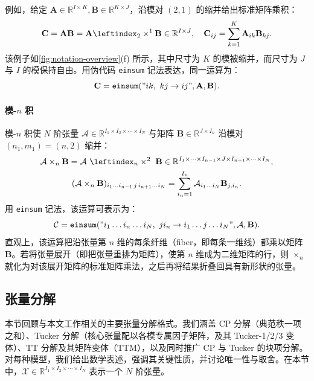 \documentclass[11pt]{article}
\newcommand{\R}{\mathbb{R}}
\newcommand{\ten}[1]{\mathcal{#1}}
\newcommand{\mat}[1]{\mathbf{#1}}
\begin{document}
例如，给定 $\mat{A} \in \R^{I \times K}, \mat{B} \in \R^{K \times J}$，沿模对 $(2,1)$ 的缩并给出标准矩阵乘积：
\begin{equation}
  \mat{C} = \mat{A} \mat{B} = \mat{A} \leftindex_{2} \times^{1} \mat{B} \in \R^{I \times J}, \quad \mat{C}_{ij} = \sum_{k=1}^{K} \mat{A}_{ik} \mat{B}_{kj}.
\end{equation}
该例子如\cref{fig:notation-overview}(f) 所示，其中尺寸为 $K$ 的模被缩并，而尺寸为 $J$ 与 $I$ 的模保持自由。用伪代码 \texttt{einsum} 记法表达，同一运算为：
\begin{equation}
  \mat{C} = \texttt{einsum}({"} ik, \ kj \to ij {"}, \mat{A}, \mat{B}).
\end{equation}

\paragraph{模-$n$ 积} 模-$n$ 积使 $N$ 阶张量 $\ten{A}\in\R^{I_1\times I_2 \times \cdots\times I_N}$ 与矩阵 $\mat{B}\in\R^{J\times I_n}$ 沿模对 $(n_1,m_1)=(n,2)$ 缩并：
\begin{equation}
\begin{gathered}
    \ten{A}\times_n\mat{B} = \ten{A} \ \leftindex_{n} \times^{2} \ \mat{B} \in\R^{I_1\times\cdots\times I_{n-1}\times J\times I_{n+1}\times\cdots\times I_N}, \\
    (\ten{A}\times_n\mat{B})_{i_1\dots i_{n-1}\,j\,i_{n+1}\dots i_N}=\sum_{i_n=1}^{I_n}\ten{A}_{i_1\dots i_N} \mat{B}_{j,i_n}.
\end{gathered}
\end{equation}
用 \texttt{einsum} 记法，该运算可表示为：
\begin{equation}
    \ten{C} = \texttt{einsum}({"} i_1\dots i_n \dots i_N, \ j i_n \to i_1 \dots j \dots i_N {"}, \ten{A}, \mat{B}).
\end{equation}
直观上，该运算把沿张量第 $n$ 维的每条纤维（fiber，即每条一维线）都乘以矩阵 $\mat{B}$。若将张量展开（即把张量重排为矩阵），使第 $n$ 维成为二维矩阵的行，则 $\times_n$ 就化为对该展开矩阵的标准矩阵乘法，之后再将结果折叠回具有新形状的张量。

\subsection{张量分解}
\label{subsec:tensor-decompositions}
本节回顾与本文工作相关的主要张量分解格式。我们涵盖 CP 分解（典范秩一项之和）、Tucker 分解（核心张量配以各模专属因子矩阵，及其 Tucker-1/2/3 变体）、TT 分解及其矩阵变体（TTM），以及同时推广 CP 与 Tucker 的块项分解。对每种模型，我们给出数学表述，强调其关键性质，并讨论唯一性与取舍。在本节中，$\ten{X} \in \R^{I_1 \times I_2 \times \cdots \times I_N}$ 表示一个 $N$ 阶张量。
\end{document}

